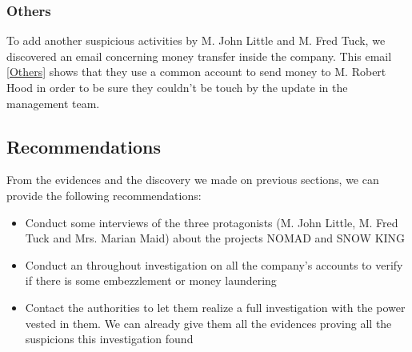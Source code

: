 \subsubsection{Others}
To add another suspicious activities by M. John Little and M. Fred Tuck, we discovered an email concerning money transfer inside the company. This email \ref{Others} shows that they use a common account to send money to M. Robert Hood in order to be sure they couldn't be touch by the update in the management team.

\subsection{Recommendations}
From the evidences and the discovery we made on previous sections, we can provide the following recommendations:
\begin{itemize}
 \item Conduct some interviews of the three protagonists (M. John Little, M. Fred Tuck and Mrs. Marian Maid) about the projects NOMAD and SNOW KING
 \item Conduct an throughout investigation on all the company's accounts to verify if there is some embezzlement or money laundering
 \item Contact the authorities to let them realize a full investigation with the power vested in them. We can already give them all the evidences proving all the suspicions this investigation found
\end{itemize}
